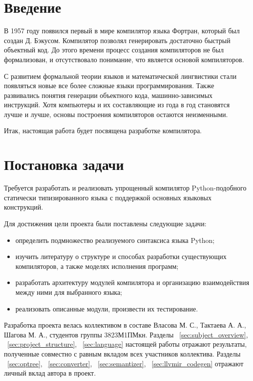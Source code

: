 \newpage
\section*{Введение}

В 1957 году появился первый в мире компилятор языка Фортран, который был создан Д. Бэкусом.
Компилятор позволял генерировать достаточно быстрый объектный код.
До этого времени процесс создания компиляторов не был формализован, и отсутствовало понимание, что является основой компиляторов.

С развитием формальной теории языков и математической лингвистики стали появляться новые все более сложные языки программирования.
Также развивались понятия генерации объектного кода, машинно-зависимых инструкций.
Хотя компьютеры и их составляющие из года в год становятся лучше и лучше, основы построения компиляторов остаются неизменными.

Итак, настоящая работа будет посвящена разработке компилятора.

\newpage
\section*{Постановка задачи}

Требуется разработать и реализовать упрощенный компилятор Python-подобного статически типизированного языка с поддержкой основных языковых конструкций.

Для достижения цели проекта были поставлены следующие задачи:

\begin{itemize}
    \item определить подмножество реализуемого синтаксиса языка Python;
    \item изучить литературу о структуре и способах разработки существующих компиляторов, а также моделях исполнения программ;
    \item разработать архитектуру модулей компилятора и организацию взаимодействия между ними для выбранного языка;
    \item реализовать описанные модули, произвести их тестирование.
\end{itemize}

Разработка проекта велась коллективом в составе Власова М. С., Тактаева А. А., Шагова М. А., студентов группы 3823М1ПМкн.
Разделы ~\ref{sec:subject_overview}, ~\ref{sec:project_structure}, ~\ref{sec:language} настоящей работы отражают результаты, полученные совместно с равным вкладом всех участников коллектива.
Разделы ~\ref{sec:optree}, ~\ref{sec:converter}, ~\ref{sec:semantizer}, ~\ref{sec:llvmir_codegen} отражают личный вклад автора в проект.

